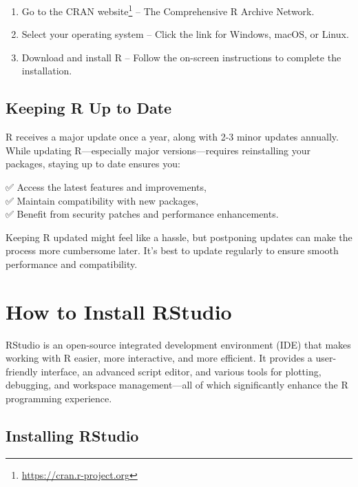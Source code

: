 \documentclass[
  11pt,
]{book}
\providecommand{\tightlist}{%
  \setlength{\itemsep}{0pt}\setlength{\parskip}{0pt}}
\renewcommand{\href}[2]{#2\footnote{\url{#1}}}
\theoremstyle{definition}
\theoremstyle{definition}
\theoremstyle{definition}
\theoremstyle{definition}
\theoremstyle{remark}
\begin{document}
\begin{enumerate}
\def\labelenumi{\arabic{enumi}.}
\tightlist
\item
  Go to the \href{https://cran.r-project.org}{CRAN website} -- The Comprehensive R Archive Network.\\
\item
  Select your operating system -- Click the link for Windows, macOS, or Linux.\\
\item
  Download and install R -- Follow the on-screen instructions to complete the installation.
\end{enumerate}

\subsection*{Keeping R Up to Date}\label{keeping-r-up-to-date}


R receives a major update once a year, along with 2-3 minor updates annually. While updating R---especially major versions---requires reinstalling your packages, staying up to date ensures you:

✅ Access the latest features and improvements,\\
✅ Maintain compatibility with new packages,\\
✅ Benefit from security patches and performance enhancements.

Keeping R updated might feel like a hassle, but postponing updates can make the process more cumbersome later. It's best to update regularly to ensure smooth performance and compatibility.

\section{How to Install RStudio}\label{how-to-install-rstudio}

RStudio is an open-source integrated development environment (IDE) that makes working with R easier, more interactive, and more efficient. It provides a user-friendly interface, an advanced script editor, and various tools for plotting, debugging, and workspace management---all of which significantly enhance the R programming experience.

\subsection*{Installing RStudio}\label{installing-rstudio}
\end{document}
